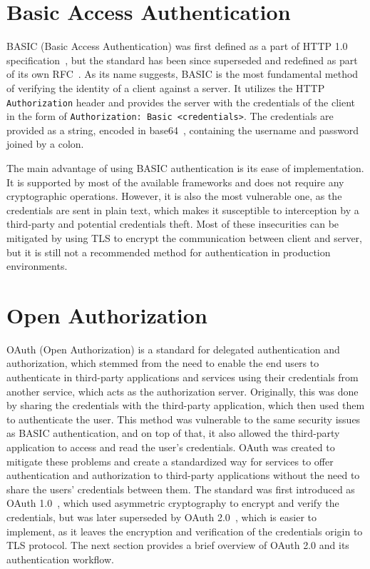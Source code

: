 \section{Basic Access Authentication}
BASIC (Basic Access Authentication) was first defined as a part of HTTP 1.0 specification \cite{http1.0_w3}, but the standard has been since superseded and redefined as part of its own RFC \cite{basic_auth_rfc}. As its name suggests, BASIC is the most fundamental method of verifying the identity of a client against a server. It utilizes the HTTP \texttt{Authorization} header and provides the server with the credentials of the client in the form of \texttt{Authorization: Basic <credentials>}. The credentials are provided as a string, encoded in base64 \cite{base64_rfc}, containing the username and password joined by a colon.

The main advantage of using BASIC authentication is its ease of implementation. It is supported by most of the available frameworks and does not require any cryptographic operations. However, it is also the most vulnerable one, as the credentials are sent in plain text, which makes it susceptible to interception by a third-party and potential credentials theft. Most of these insecurities can be mitigated by using TLS to encrypt the communication between client and server, but it is still not a recommended method for authentication in production environments.

\section{Open Authorization}
OAuth (Open Authorization) is a standard for delegated authentication and authorization, which stemmed from the need to enable the end users to authenticate in third-party applications and services using their credentials from another service, which acts as the authorization server. Originally, this was done by sharing the credentials with the third-party application, which then used them to authenticate the user. This method was vulnerable to the same security issues as BASIC authentication, and on top of that, it also allowed the third-party application to access and read the user's credentials. OAuth was created to mitigate these problems and create a standardized way for services to offer authentication and authorization to third-party applications without the need to share the users' credentials between them. The standard was first introduced as OAuth 1.0 \cite{oauth1_rfc}, which used asymmetric cryptography to encrypt and verify the credentials, but was later superseded by OAuth 2.0 \cite{oauth2_rfc}, which is easier to implement, as it leaves the encryption and verification of the credentials origin to TLS protocol. The next section provides a brief overview of OAuth 2.0 and its authentication workflow.

